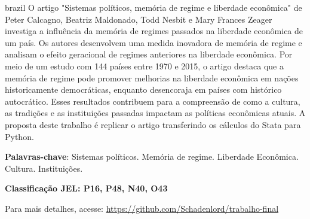 \documentclass[
	article,
	12pt,
	oneside,
	a4paper,
	english,
	brazil,
	sumario=tradicional
]{abntex2}
\begin{document}
\renewcommand{\resumoname}{Resumo}
\begin{resumoumacoluna}
\begin{otherlanguage*}{brazil}
   \noindent 
   O artigo "Sistemas políticos, memória de regime e liberdade econômica" de Peter Calcagno, Beatriz Maldonado, Todd Nesbit e Mary Frances Zeager investiga a influência da memória de regimes passados na liberdade econômica de um país. Os autores desenvolvem uma medida inovadora de memória de regime e analisam o efeito geracional de regimes anteriores na liberdade econômica. Por meio de um estudo com 144 países entre 1970 e 2015, o artigo destaca que a memória de regime pode promover melhorias na liberdade econômica em nações historicamente democráticas, enquanto desencoraja em países com histórico autocrático. Esses resultados contribuem para a compreensão de como a cultura, as tradições e as instituições passadas impactam as políticas econômicas atuais. A proposta deste trabalho é replicar o artigo transferindo os cálculos do Stata para Python.   
   
   \textbf{Palavras-chave}: Sistemas políticos. Memória de regime. Liberdade Econômica. Cultura. Instituições.
   
   \textbf{Classificação JEL: P16, P48, N40, O43}

	   Para mais detalhes, acesse: \url{https://github.com/Schadenlord/trabalho-final}

 \end{otherlanguage*}  
\end{resumoumacoluna}

\newpage


\textual



\renewcommand{\refname}{Referências}


\end{document}
